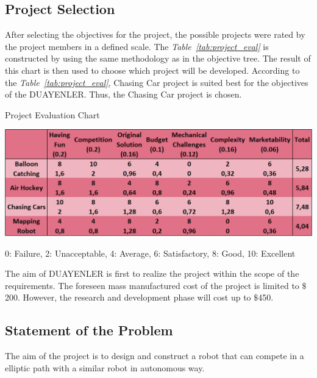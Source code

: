 \documentclass[a4paper,12pt]{article}
\begin{document}
	
	\subsection{Project Selection}	
	
		After selecting the objectives for the project, the possible projects were rated by the project members in a defined scale. The \textit{Table~\ref{tab:project_eval}} is constructed by using the same methodology as in the objective tree. The result of this chart is then used to choose which project will be developed. According to the \textit{Table~\ref{tab:project_eval}}, Chasing Car project is suited best for the objectives of the DUAYENLER. Thus, the Chasing Car project is chosen.
		
	\begin{table}[H]
		\centering
		\caption{\label{tab:project_eval}Project Evaluation Chart}\vspace{-.2cm}
		\includegraphics[width=\textwidth,height=\textheight,keepaspectratio]{images/project_evaluation4} 
	\vspace*{-.9cm}	\begin{center}
		{\small 0: Failure, 2: Unacceptable, 4: Average, 6: Satisfactory, 8: Good, 10: Excellent }	
		\end{center}
	\end{table}	\vspace*{-.5cm}	
	
	The aim of DUAYENLER is first to realize the project within the scope of the requirements. The foreseen mass manufactured cost of the project is limited to $\$$200. However, the research and development phase will cost up to 	$\$$450.
	
	\subsection{Statement of the Problem}
		
			The aim of the project is to design and construct a robot that can compete in a elliptic path with a similar robot in autonomous way.
			
\end{document}
